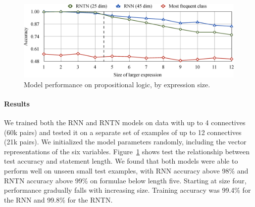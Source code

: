 \begin{figure}[t]
  \centering
  \includegraphics[width=5.75in]{decayfig.eps}
  \caption{Model performance on propositional logic, by expression size.}
    
  \label{prop-results} 
  
\end{figure}

\paragraph{Results} 
We trained both the RNN and RNTN models on data with up to 4
connectives (60k pairs) and tested it on a separate set of examples of up to 12
connectives (21k pairs). We initialized the model parameters randomly,
including the vector representations of the six variables.
Figure~\ref{prop-results} shows test the relationship
between test accuracy and statement length. We found that both 
models were able to perform well on unseen small test examples, 
with RNN accuracy above
98\% and RNTN accuracy above 99\% on formulae below length five.
Starting at size four, performance gradually falls with increasing
size. Training accuracy was 99.4\% for the RNN and 99.8\% for the RNTN.

